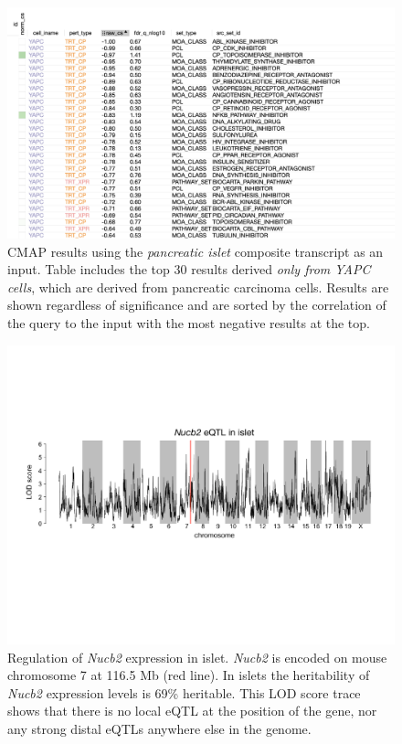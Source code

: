 \documentclass[
]{article}
\begin{document}
\begin{figure}[ht!]
\includegraphics[width=\textwidth]{Figures/Supp_Fig_Islet_YAPC.png} 
\caption{CMAP results using the \textit{pancreatic islet} composite 
transcript as an input. Table includes the top 30 results derived
\textit{only from YAPC cells}, which are derived from pancreatic
carcinoma cells. Results are shown regardless of significance and
are sorted by the correlation of the query to the input 
with the most negative results at the top.
}
\label{fig:clue_islet_yapc}
\end{figure}

\begin{figure}[ht!]
\includegraphics[width=\textwidth]{Figures/Supplemental_FigX_Nucb2_eQTL.pdf} 
\caption{Regulation of \textit{Nucb2} expression in islet. \textit{Nucb2} 
is encoded on mouse chromosome 7 at 116.5 Mb (red line). In islets the 
heritability of \textit{Nucb2} expression levels is 69\% heritable. This 
LOD score trace shows that there is no local eQTL at the position of the
gene, nor any strong distal eQTLs anywhere else in the genome. 
}
\label{fig:Nucb2_eqtl}
\end{figure}
\end{document}
